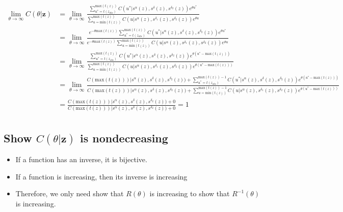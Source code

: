 \documentclass{article}
\begin{document}
\begin{align*}
  \lim_{\theta \to \infty} C(\theta|\textbf{z}) 
  &= \lim_{\theta \to \infty} \frac
  {\sum_{u^*=t(z_{obs})}^{\text{max}(t(z))} C(u^*|s^\alpha(z), s^\delta(z), s^{\delta_2}(z))e^{\theta u^*}}
  {\sum_{u=\text{min}(t(z))}^{\text{max}(t(z))} C(u|s^\alpha(z), s^{\delta_1}(z), s^{\delta_2}(z))e^{\theta u}} \\
  &= \lim_{\theta \to \infty} \frac
  {e^{-\theta \text{max}(t(z))} \sum_{u^*=t(z_{obs})}^{\text{max}(t(z))} 
  C(u^*|s^\alpha(z), s^\delta(z), s^{\delta_2}(z))e^{\theta u^*}}
  {e^{-\theta \text{max}(t(z))} \sum_{u=\text{min}(t(z))}^{\text{max}(t(z))} 
  C(u|s^\alpha(z), s^{\delta_1}(z), s^{\delta_2}(z))e^{\theta u}} \\
  &= \lim_{\theta \to \infty} \frac
  {\sum_{u^*=t(z_{obs})}^{\text{max}(t(z))} 
  C(u^*|s^\alpha(z), s^\delta(z), s^{\delta_2}(z))e^{\theta (u^*-\text{max}(t(z)))}}
  {\sum_{u=\text{min}(t(z))}^{\text{max}(t(z))} 
  C(u|s^\alpha(z), s^{\delta_1}(z), s^{\delta_2}(z))e^{\theta (u^*-\text{max}(t(z)))}} \\
  &= \lim_{\theta \to \infty} \frac
  {C(\text{max}(t(z)))|s^\alpha(z), s^\delta(z), s^{\delta_2}(z)) + \sum_{u^*=t(z_{obs})}^{\text{max}(t(z))-1} 
  C(u^*|s^\alpha(z), s^\delta(z), s^{\delta_2}(z))e^{\theta (u^*-\text{max}(t(z)))}}
  {C(\text{max}(t(z)))|s^\alpha(z), s^\delta(z), s^{\delta_2}(z)) + \sum_{u=\text{min}(t(z))}^{\text{max}(t(z))-1} 
  C(u|s^\alpha(z), s^{\delta_1}(z), s^{\delta_2}(z))e^{\theta (u^*-\text{max}(t(z)))}} \\
  &= \frac
  {C(\text{max}(t(z)))|s^\alpha(z), s^\delta(z), s^{\delta_2}(z)) + 0}
  {C(\text{max}(t(z)))|s^\alpha(z), s^\delta(z), s^{\delta_2}(z)) + 0} = 1 \\
\end{align*}

\subsection{Show $C(\theta|\textbf{z})$ is nondecreasing}

\begin{itemize}
  \item If a function has an inverse, it is bijective.
  \item If a function is increasing, then its inverse is increasing
  \item Therefore, we only need show that $R(\theta)$ is increasing to show that $R^{-1}(\theta)$ is increasing. 
\end{itemize}
\end{document}
